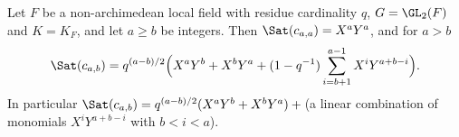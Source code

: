 Let $F$ be a non-archimedean local field with residue cardinality $q$, $G=\GL_2(F)$ and $K=K_F$, and let $a\ge b$ be
integers. Then $\Sat(c_{a,a})=X^aY^a$, and for $a>b$
\[
  \Sat(c_{a,b})=q^{(a-b)/2}\Bigl(X^aY^b+X^bY^a+(1-q^{-1})\sum_{i=b+1}^{a-1}X^iY^{a+b-i}\Bigr).
\]
In particular $\Sat(c_{a,b})=q^{(a-b)/2}(X^aY^b+X^bY^a)+{}$(a linear combination of monomials $X^iY^{a+b-i}$
with $b<i<a$).
